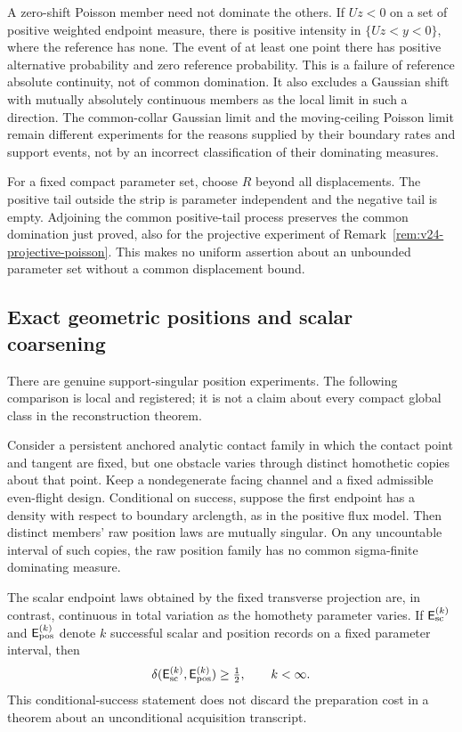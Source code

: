 A zero-shift Poisson member need not dominate the others.  If \(Uz<0\) on
a set of positive weighted endpoint measure, there is positive intensity
in \(\{Uz<y<0\}\), where the reference has none.  The event of at least
one point there has positive alternative probability and zero reference
probability.  This is a failure of reference absolute continuity, not of
common domination.  It also excludes a Gaussian shift with mutually
absolutely continuous members as the local limit in such a direction.
The common-collar Gaussian limit and the moving-ceiling Poisson limit remain
different experiments for the reasons supplied by their boundary rates and
support events, not by an incorrect classification of their dominating
measures.

For a fixed compact parameter set, choose \(R\) beyond all displacements.
The positive tail outside the strip is parameter independent and the negative
tail is empty.  Adjoining the common positive-tail process preserves the
common domination just proved, also for the projective experiment of
Remark~\ref{rem:v24-projective-poisson}.  This makes no uniform assertion
about an unbounded parameter set without a common displacement bound.

\subsection{Exact geometric positions and scalar coarsening}

There are genuine support-singular position experiments.  The following
comparison is local and registered; it is not a claim about every compact
global class in the reconstruction theorem.

\begin{proposition}
\label{prop:v26-position-deficiency}
Consider a persistent anchored analytic contact family in which the contact
point and tangent are fixed, but one obstacle varies through distinct
homothetic copies about that point.  Keep a nondegenerate facing channel and
a fixed admissible even-flight design.  Conditional on success, suppose the
first endpoint has a density with respect to boundary arclength, as in the
positive flux model.  Then distinct members' raw position laws are mutually
singular.  On any uncountable interval of such copies, the raw position
family has no common sigma-finite dominating measure.

The scalar endpoint laws obtained by the fixed transverse projection are,
in contrast, continuous in total variation as the homothety parameter
varies.  If \(\mathsf E^{(k)}_{\rm sc}\) and
\(\mathsf E^{(k)}_{\rm pos}\) denote \(k\) successful scalar and position
records on a fixed parameter interval, then
\begin{equation}\label{eq:v26-position-deficiency}
 \delta(\mathsf E^{(k)}_{\rm sc},\mathsf E^{(k)}_{\rm pos})\ge\tfrac12,
 \qquad k<\infty.
\end{equation}
This conditional-success statement does not discard the preparation cost
in a theorem about an unconditional acquisition transcript.
\end{proposition}


